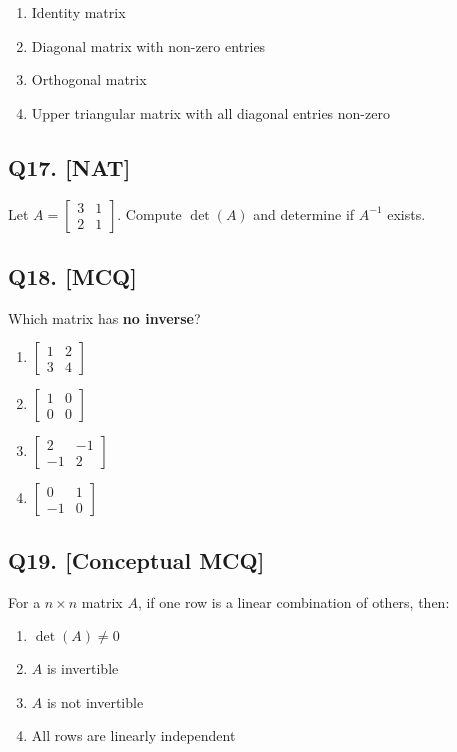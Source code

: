 \begin{enumerate}[label=(\alph*)]
    \item Identity matrix
    \item Diagonal matrix with non-zero entries
    \item Orthogonal matrix
    \item Upper triangular matrix with all diagonal entries non-zero
\end{enumerate}

\subsection*{Q17. [NAT]}
Let $A = \begin{bmatrix} 3 & 1 \\ 2 & 1 \end{bmatrix}$. Compute $\det(A)$ and determine if $A^{-1}$ exists.

\subsection*{Q18. [MCQ]}
Which matrix has \textbf{no inverse}?

\begin{enumerate}[label=(\alph*)]
    \item $\begin{bmatrix} 1 & 2 \\ 3 & 4 \end{bmatrix}$
    \item $\begin{bmatrix} 1 & 0 \\ 0 & 0 \end{bmatrix}$
    \item $\begin{bmatrix} 2 & -1 \\ -1 & 2 \end{bmatrix}$
    \item $\begin{bmatrix} 0 & 1 \\ -1 & 0 \end{bmatrix}$
\end{enumerate}

\subsection*{Q19. [Conceptual MCQ]}
For a $n \times n$ matrix $A$, if one row is a linear combination of others, then:

\begin{enumerate}[label=(\alph*)]
    \item $\det(A) \neq 0$
    \item $A$ is invertible
    \item $A$ is not invertible
    \item All rows are linearly independent
\end{enumerate}

